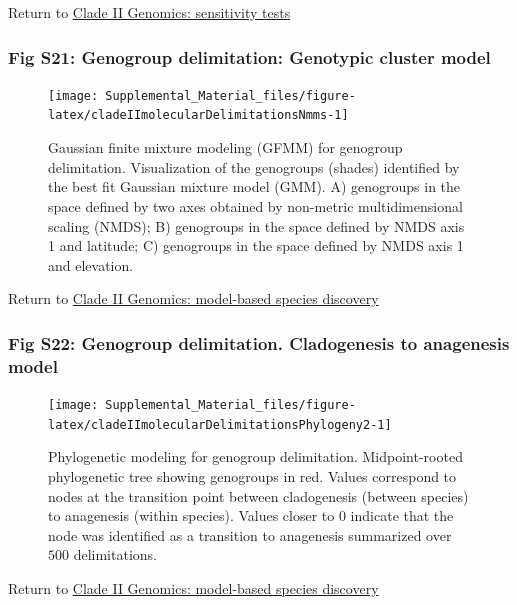 \documentclass[
  11pt,
]{article}
\begin{document}
Return to \protect\hyperlink{sensitivity-tests-1}{Clade II Genomics: sensitivity tests}
\pagebreak

\hypertarget{fig-s21-genogroup-delimitation-genotypic-cluster-model}{%
\subsubsection{Fig S21: Genogroup delimitation: Genotypic cluster model}\label{fig-s21-genogroup-delimitation-genotypic-cluster-model}}

\begin{figure}
\texttt{[image: Supplemental\_Material\_files/figure-latex/cladeIImolecularDelimitationsNmms-1]} \caption{Gaussian finite mixture modeling (GFMM) for genogroup delimitation. Visualization of the genogroups (shades) identified by the best fit Gaussian mixture model (GMM). A) genogroups in the space defined by two axes obtained by non-metric multidimensional scaling (NMDS); B) genogroups in the space defined by NMDS axis 1 and latitude; C) genogroups in the space defined by NMDS axis 1 and elevation.}\label{fig:cladeIImolecularDelimitationsNmms}
\end{figure}

Return to \protect\hyperlink{model-based-species-discovery-3}{Clade II Genomics: model-based species discovery}
\pagebreak

\hypertarget{fig-s22-genogroup-delimitation.-cladogenesis-to-anagenesis-model}{%
\subsubsection{Fig S22: Genogroup delimitation. Cladogenesis to anagenesis model}\label{fig-s22-genogroup-delimitation.-cladogenesis-to-anagenesis-model}}

\begin{figure}
\texttt{[image: Supplemental\_Material\_files/figure-latex/cladeIImolecularDelimitationsPhylogeny2-1]} \caption{Phylogenetic modeling for genogroup delimitation. Midpoint-rooted phylogenetic tree showing genogroups in red. Values correspond to nodes at the transition point between cladogenesis (between species) to anagenesis (within species). Values closer to 0 indicate that the node was identified as a transition to anagenesis summarized over $500$ delimitations.}\label{fig:cladeIImolecularDelimitationsPhylogeny2}
\end{figure}

Return to \protect\hyperlink{model-based-species-discovery-3}{Clade II Genomics: model-based species discovery}
\pagebreak
\end{document}
